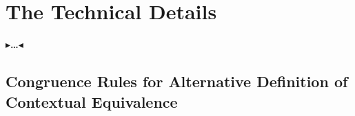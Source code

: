 \documentclass[twoside,11pt,openright]{report}
\theoremstyle{definition}
\newcommand{\todo}[1]{{\color[rgb]{.5,0,0}\textbf{$\blacktriangleright$#1$\blacktriangleleft$}}}
\begin{document}
\cleardoublepage
{}
 



\cleardoublepage
\appendix
\chapter{The Technical Details}

\todo{\dots}

\section{Congruence Rules for Alternative Definition of Contextual Equivalence}\label{appendix:Cgr}
\end{document}
